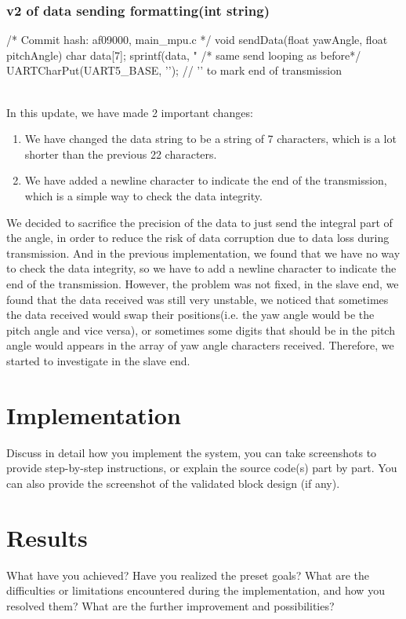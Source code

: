 \documentclass[12pt, a4paper]{article}
\begin{document}
\subsubsection{v2 of data sending formatting(int string)}\text{}
\begin{code}[language=c] 
/* Commit hash: af09000, main_mpu.c */
void sendData(float yawAngle, float pitchAngle) {
    char data[7]; 
    sprintf(data, "%
    /* same send looping as before*/
    UARTCharPut(UART5_BASE, '\n'); // '\n' to mark end of transmission
}
\end{code}
\textbf{}\\
In this update, we have made 2 important changes:
\begin{enumerate}
    \item We have changed the data string to be a string of 7 characters, which is a lot shorter than the previous 22 characters.
    \item We have added a newline character to indicate the end of the transmission, which is a simple way to check the data integrity.
\end{enumerate}
We decided to sacrifice the precision of the data to just send the integral part of the angle, 
in order to reduce the risk of data corruption due to data loss during transmission. 
And in the previous implementation, we found that we have no way to check the data integrity, 
so we have to add a newline character to indicate the end of the transmission.
However, the problem was not fixed, in the slave end, we found that the data received was still very unstable, 
we noticed that sometimes the data received would swap their positions(i.e. the yaw angle would be the pitch angle and vice versa), 
or sometimes some digits that should be in the pitch angle would appears in the array of yaw angle characters received.
Therefore, we started to investigate in the slave end.

\section{Implementation}
Discuss in detail how you implement the system, you can take
screenshots to provide step-by-step instructions, or explain the source
code(s) part by part. You can also provide the screenshot of the
validated block design (if any).

\section{Results}
What have you achieved? Have you realized the preset goals?
What are the difficulties or limitations encountered during the
implementation, and how you resolved them?
What are the further improvement and possibilities?
\end{document}
